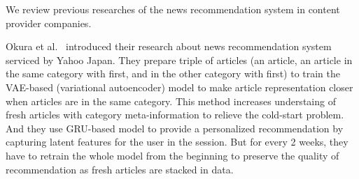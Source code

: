 We review previous researches of the news recommendation system in content provider companies.

Okura et al.~\cite{Yahoo2017} introduced their research about news recommendation system serviced by Yahoo Japan.
They prepare triple of articles (an article, an article in the same category with first, and in the other category with first) to train the VAE-based (variational autoencoder) model to make article representation closer when articles are in the same category.
This method increases understaing of fresh articles with category meta-information to relieve the cold-start problem.
And they use GRU-based model to provide a personalized recommendation by capturing latent features for the user in the session.
But for every 2 weeks, they have to retrain the whole model from the beginning to preserve the quality of recommendation as fresh articles are stacked in data.

%


